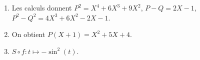 \begin{correction}  \;
\begin{enumerate}
\item Les calculs donnent $P^2=X^4+6X^3+9X^2$, $P-Q=2X-1$, $P^2-Q^2=4X^3+6X^2-2X-1$.
\item On obtient $P(X+1)=X^2+5X+4$.
\item $S\circ f : t \mapsto -\sin^2(t) $.
\end{enumerate}
\end{correction}
